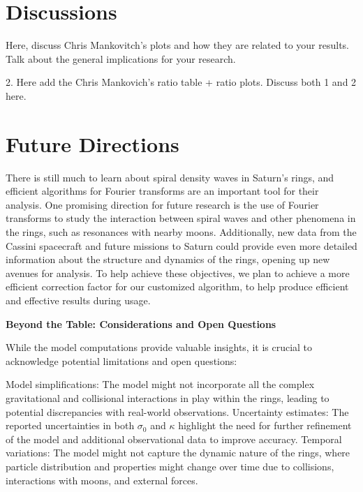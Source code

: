 \documentclass{article}
\begin{document}
\section{Discussions}
Here, discuss Chris Mankovitch's plots and how they are related to your results. Talk about the general implications for your research.

2. Here add the Chris Mankovich's ratio table + ratio plots. Discuss both 1 and 2 here.


\section{Future Directions}
There is still much to learn about spiral density waves in Saturn's rings, and efficient algorithms for Fourier transforms are an important tool for their analysis. One promising direction for future research is the use of Fourier transforms to study the interaction between spiral waves and other phenomena in the rings, such as resonances with nearby moons. Additionally, new data from the Cassini spacecraft and future missions to Saturn could provide even more detailed information about the structure and dynamics of the rings, opening up new avenues for analysis. To help achieve these objectives, we plan to achieve a more efficient correction factor for our customized algorithm, to help produce efficient and effective results during usage. 




\textbf{Beyond the Table: Considerations and Open Questions}

While the model computations provide valuable insights, it is crucial to acknowledge potential limitations and open questions:

Model simplifications: The model might not incorporate all the complex gravitational and collisional interactions in play within the rings, leading to potential discrepancies with real-world observations.
Uncertainty estimates: The reported uncertainties in both $\sigma_{0}$ and $\kappa$ highlight the need for further refinement of the model and additional observational data to improve accuracy.
Temporal variations: The model might not capture the dynamic nature of the rings, where particle distribution and properties might change over time due to collisions, interactions with moons, and external forces.
\end{document}
